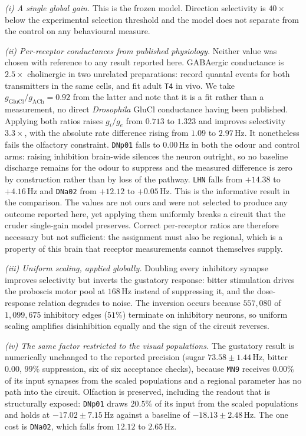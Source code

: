\documentclass[10pt,twoside]{article}
\newcommand{\cell}[1]{\texttt{#1}}
\begin{document}
\emph{(i) A single global gain.} This is the frozen model. Direction
selectivity is $40\times$ below the experimental selection threshold and the
model does not separate from the control on any behavioural measure.

\emph{(ii) Per-receptor conductances from published physiology.} Neither value
was chosen with reference to any result reported here. GABAergic conductance is
$2.5\times$ cholinergic in two unrelated preparations: \citet{suodowd2003}
record quantal events for both transmitters in the same cells, and
\citet{groschner2022} fit adult \cell{T4} in vivo. We take
$g_{\mathrm{GluCl}}/g_{\mathrm{ACh}} = 0.92$ from the latter and note that it is
a fit rather than a measurement, no direct \emph{Drosophila} GluCl conductance
having been published. Applying both ratios raises $g_i/g_e$ from $0.713$ to
$1.323$ and improves selectivity $3.3\times$, with the absolute rate difference
rising from $1.09$ to $2.97$\,Hz. It nonetheless fails the olfactory
constraint. \cell{DNp01} falls to $0.00$\,Hz in both the odour and control
arms: raising inhibition brain-wide silences the neuron outright, so no
baseline discharge remains for the odour to suppress and the measured
difference is zero by construction rather than by loss of the pathway.
\cell{LHN} falls from $+14.38$ to $+4.16$\,Hz and \cell{DNa02} from $+12.12$
to $+0.05$\,Hz. This is the informative result in the comparison. The values
are not ours and were not selected to produce any outcome reported here, yet
applying them uniformly breaks a circuit that the cruder single-gain model
preserves. Correct per-receptor ratios are therefore necessary but not
sufficient: the assignment must also be regional, which is a property of this
brain that receptor measurements cannot themselves supply.

\emph{(iii) Uniform scaling, applied globally.} Doubling every inhibitory
synapse improves selectivity but inverts the gustatory response: bitter
stimulation drives the proboscis motor pool at $168$\,Hz instead of suppressing
it, and the dose-response relation degrades to noise. The inversion occurs
because $557{,}080$ of $1{,}099{,}675$ inhibitory edges ($51\%$) terminate on
inhibitory neurons, so uniform scaling amplifies disinhibition equally and the
sign of the circuit reverses.

\emph{(iv) The same factor restricted to the visual populations.} The gustatory
result is numerically unchanged to the reported precision (sugar
$73.58\pm1.44$\,Hz, bitter $0.00$, $99\%$ suppression, six of six acceptance
checks), because \cell{MN9} receives $0.00\%$ of its input synapses from the
scaled populations and a regional parameter has no path into the circuit.
Olfaction is preserved, including the readout that is structurally exposed:
\cell{DNp01} draws $20.5\%$ of its input from the scaled populations and holds
at $-17.02\pm7.15$\,Hz against a baseline of $-18.13\pm2.48$\,Hz. The one cost
is \cell{DNa02}, which falls from $12.12$ to $2.65$\,Hz.
\end{document}
